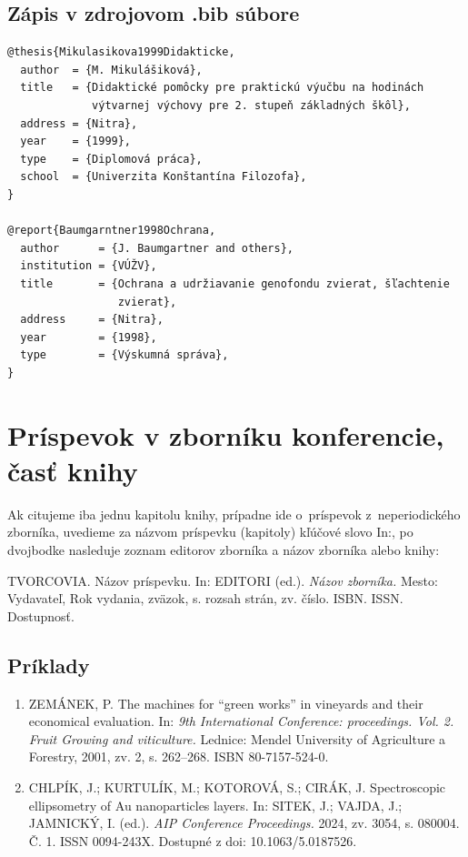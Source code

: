 \subsection*{\normalsize Zápis v zdrojovom .bib súbore}
\begin{verbatim}
@thesis{Mikulasikova1999Didakticke,
  author  = {M. Mikulášiková},
  title   = {Didaktické pomôcky pre praktickú výučbu na hodinách
             výtvarnej výchovy pre 2. stupeň základných škôl},
  address = {Nitra},
  year    = {1999},
  type    = {Diplomová práca},
  school  = {Univerzita Konštantína Filozofa},
}

@report{Baumgarntner1998Ochrana,
  author      = {J. Baumgartner and others},
  institution = {VÚŽV},
  title       = {Ochrana a udržiavanie genofondu zvierat, šľachtenie
                 zvierat},
  address     = {Nitra},
  year        = {1998},
  type        = {Výskumná správa},
}
\end{verbatim}

\section{Príspevok v zborníku konferencie, časť knihy}
Ak citujeme iba jednu kapitolu knihy,
prípadne ide o~príspevok z~neperiodického zborníka,
uvedieme za názvom príspevku (kapitoly)
kľúčové slovo In:, po dvojbodke nasleduje zoznam editorov zborníka a názov zborníka alebo knihy:
\begin{trivlist}
  \item TVORCOVIA. Názov príspevku. In: EDITORI (ed.). \textit{Názov zborníka.} Mesto: Vydavateľ, Rok vydania, zväzok, s. rozsah strán, zv. číslo. ISBN. ISSN. Dostupnosť.
\end{trivlist}

\subsection*{\normalsize Príklady}
\begin{enumerate}
  \item ZEMÁNEK, P. The machines for ``green works'' in vineyards and their economical evaluation. In: \textit{9th International Conference: proceedings. Vol. 2. Fruit Growing and viticulture.} Lednice: Mendel University of Agriculture a Forestry, 2001, zv. 2, s. 262–268. ISBN 80-7157-524-0.

  \item CHLPÍK, J.; KURTULÍK, M.; KOTOROVÁ, S.; CIRÁK, J. Spectroscopic ellipsometry of Au nanoparticles layers. In: SITEK, J.; VAJDA, J.; JAMNICKÝ, I. (ed.). \textit{AIP Conference Proceedings.} 2024, zv. 3054, s. 080004. Č. 1. ISSN 0094-243X. Dostupné z doi: 10.1063/5.0187526.
\end{enumerate}

